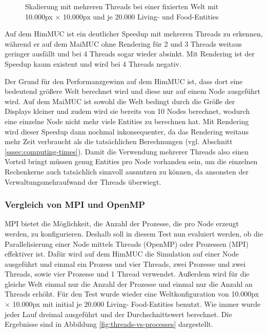\documentclass[course=erap]{aspdoc}
\begin{document}
\begin{figure}[h!]
\centering
{}
\caption{Skalierung mit mehreren Threads bei einer fixierten Welt mit 10.000px $\times$ 10.000px und je 20.000 Living- und Food-Entities}
\label{fig:thread-scaling}
\end{figure}

Auf dem HimMUC ist ein deutlicher Speedup mit mehreren Threads zu erkennen, während er auf dem MaiMUC ohne Rendering für 2 und 3 Threads weitaus geringer ausfällt und bei 4 Threads sogar wieder absinkt. Mit Rendering ist der Speedup kaum existent und wird bei 4 Threads negativ.

Der Grund für den Performanzgewinn auf dem HimMUC ist, dass dort eine bedeutend größere Welt berechnet wird und diese nur auf einem Node ausgeführt wird. Auf dem MaiMUC ist sowohl die Welt bedingt durch die Größe der Displays kleiner und zudem wird sie bereits von 10 Nodes berechnet, wodurch eine einzelne Node nicht mehr viele Entities zu berechnen hat. Mit Rendering wird dieser Speedup dann nochmal inkonsequenter, da das Rendering weitaus mehr Zeit verbraucht als die tatsächlichen Berechnungen (vgl. Abschnitt \ref{sssec:computing-times}). Damit die Verwendung mehrerer Threads also einen Vorteil bringt müssen genug Entities pro Node vorhanden sein, um die einzelnen Rechenkerne auch tatsächlich sinnvoll ausnutzen zu können, da ansonsten der Verwaltungsmehraufwand der Threads überwiegt.

\subsubsection{Vergleich von MPI und OpenMP}
MPI bietet die Möglichkeit, die Anzahl der Prozesse, die pro Node erzeugt werden, zu konfigurieren. Deshalb soll in diesem Test nun evaluiert werden, ob die Parallelisierung einer Node mittels Threads (OpenMP) oder Prozessen (MPI) effektiver ist. Dafür wird auf dem HimMUC die Simulation auf einer Node ausgeführt und einmal ein Prozess und vier Threads, zwei Prozesse und zwei Threads, sowie vier Prozesse und 1 Thread verwendet. Außerdem wird für die gleiche Welt einmal nur die Anzahl der Prozesse und einmal nur die Anzahl an Threads erhöht. Für den Test wurde wieder eine Weltkonfiguration von 10.000px $\times$ 10.000px mit initial je 20.000 Living- Food-Entities benutzt. Wie immer wurde jeder Lauf dreimal ausgeführt und der Durchschnittswert berechnet. Die Ergebnisse sind in Abbildung \ref{fig:threads-vs-processes} dargestellt.
\end{document}
